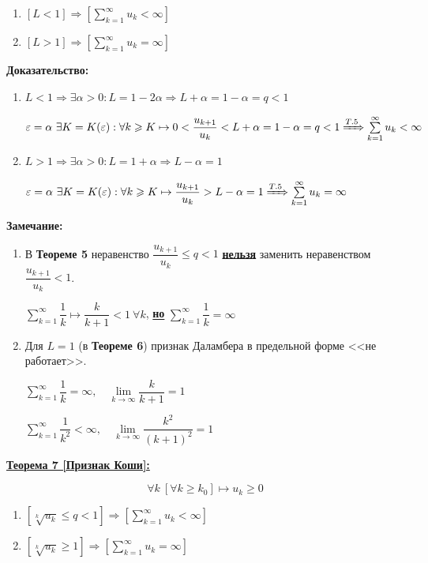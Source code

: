 \documentclass[a4paper,12pt]{article} %
\newcommand{\series}{\sum\limits_{k=1}^{\infty}}
\newcommand{\useriesl}{\sum\limits_{k=1}^{\infty} u_k < \infty}
\newcommand{\useriese}{\sum\limits_{k=1}^{\infty} u_k = \infty}
\begin{document}
\begin{enumerate}
	\item $\left[ L < 1 \right] \Rightarrow \left[ \useriesl \right]$
	\item $\left[ L > 1 \right] \Rightarrow \left[ \useriese \right]$
\end{enumerate}

\textbf{Доказательство:}
\begin{enumerate}
	\item $L < 1 \Rightarrow \exists \alpha > 0: L = 1 - 2\alpha \Rightarrow L + \alpha = 1 - \alpha = q < 1$
	
	$\varepsilon = \alpha \ \exists K = K(\varepsilon): \forall k \geqslant K \mapsto 0 < \dfrac{u_{k+1}}{u_k} < L + \alpha = 1 - \alpha = q < 1 \xRightarrow[]{T.5} \useriesl$
	\item $L > 1 \Rightarrow \exists \alpha > 0: L = 1 + \alpha \Rightarrow L - \alpha = 1$
	
	$\varepsilon = \alpha \ \exists K = K(\varepsilon): \forall k \geqslant K \mapsto \dfrac{u_{k+1}}{u_k} > L - \alpha = 1 \xRightarrow[]{T.5} \useriese$
\end{enumerate}

\textbf{Замечание:}
\begin{enumerate}
	\item В \textbf{Теореме 5} неравенство $\dfrac{u_{k+1}}{u_k} \leqslant q < 1$ \underline{\textbf{нельзя}} заменить неравенством $\dfrac{u_{k+1}}{u_k} < 1$.
	
	$\series \dfrac{1}{k} \mapsto \dfrac{k}{k+1} < 1 \ \forall k$, \underline{\textbf{но}} $\series \dfrac{1}{k} = \infty$
	\item Для $L = 1$ (в \textbf{Теореме 6}) признак Даламбера в предельной форме <<не работает>>.
	
	$\series \dfrac{1}{k} = \infty, \hspace{1em} \lim\limits_{k \to \infty} \dfrac{k}{k+1} = 1$
	
	$\series \dfrac{1}{k^2} < \infty, \hspace{1em} \lim\limits_{k \to \infty} \dfrac{k^2}{(k+1)^2} = 1$
\end{enumerate}

\underline{\textbf{Теорема 7 [Признак Коши]:}}

$$\forall k \ [\forall k \geqslant k_0] \mapsto u_k \geqslant 0$$

\begin{enumerate}
	\item $ \left[ \sqrt[k]{u_k} \leqslant q < 1 \right] \Rightarrow \left[ \useriesl \right]$
	\item $ \left[ \sqrt[k]{u_k} \geqslant 1 \right] \Rightarrow \left[ \useriese \right]$
\end{enumerate}
\end{document}
